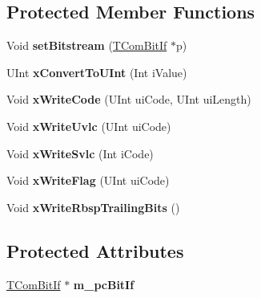 \subsection*{Protected Member Functions}
\begin{DoxyCompactItemize}
\item 
\mbox{\label{class_syntax_element_writer_a8956e4a6b66f51c430d208ff9cdaf549}} 
Void {\bfseries set\+Bitstream} (\hyperlink{class_t_com_bit_if}{T\+Com\+Bit\+If} $\ast$p)
\item 
\mbox{\label{class_syntax_element_writer_a586d9f35df1fbb751d00722545521567}} 
U\+Int {\bfseries x\+Convert\+To\+U\+Int} (Int i\+Value)
\end{DoxyCompactItemize}
{\bf }\par
\begin{DoxyCompactItemize}
\item 
\mbox{\label{class_syntax_element_writer_a209233e73f029f04259576e4fdedabbe}} 
Void {\bfseries x\+Write\+Code} (U\+Int ui\+Code, U\+Int ui\+Length)
\item 
\mbox{\label{class_syntax_element_writer_ae87257420d582dceaa443e7d7e66efda}} 
Void {\bfseries x\+Write\+Uvlc} (U\+Int ui\+Code)
\item 
\mbox{\label{class_syntax_element_writer_a5e10d0c952a646d79a0c55e5f4c1051f}} 
Void {\bfseries x\+Write\+Svlc} (Int i\+Code)
\item 
\mbox{\label{class_syntax_element_writer_acd0f4ed8d20b0194981ad8805391cf6c}} 
Void {\bfseries x\+Write\+Flag} (U\+Int ui\+Code)
\item 
\mbox{\label{class_syntax_element_writer_aa47f1c05d8879ca616bd474098a7b1da}} 
Void {\bfseries x\+Write\+Rbsp\+Trailing\+Bits} ()
\end{DoxyCompactItemize}

\subsection*{Protected Attributes}
\begin{DoxyCompactItemize}
\item 
\mbox{\label{class_syntax_element_writer_a7f28c1886fd8fd2b11b7fbeb465cba3b}} 
\hyperlink{class_t_com_bit_if}{T\+Com\+Bit\+If} $\ast$ {\bfseries m\+\_\+pc\+Bit\+If}
\end{DoxyCompactItemize}


